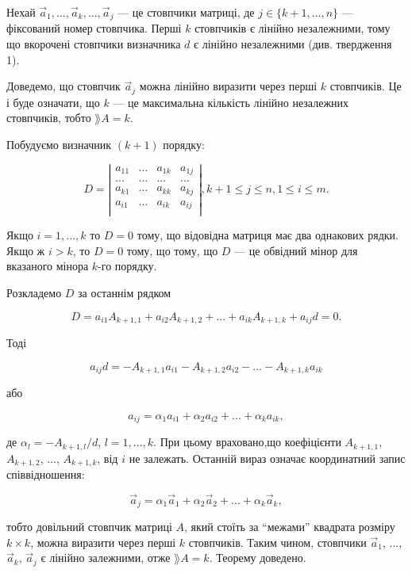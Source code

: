 Нехай $\overrightarrow{a}_1, ...,\overrightarrow{a}_k, ..., \overrightarrow{a}_j$ --- це
стовпчики матриці, де $j \in \{k+1, ..., n\}$ ---
фіксований номер стовпчика. Перші $k$ стовпчиків є лінійно незалежними, тому що
вкорочені стовпчики визначника $d$ є лінійно незалежними (див. твердження 1).

Доведемо, що стовпчик $\overrightarrow{a}_j$ можна лінійно виразити через перші $k$ стовпчиків.
Це і буде означати, що $k$ --- це максимальна кількість лінійно незалежних
стовпчиків, тобто $\rang A = k$.


Побудуємо визначник $(k + 1)$ порядку:

$$D = \left| \begin{matrix}
	a_{11} & ... & a_{1k} & a_{1j} \\
	...    & ... & ...    & ...    \\
	a_{k1} & ... & a_{kk} & a_{kj} \\
	a_{i1} & ... & a_{ik} & a_{ij} \\
\end{matrix} \right|, k+1 \leqslant j \leqslant n, 1 \leqslant i \leqslant m.$$


Якщо $i = 1, ..., k$ то $D = 0$ тому, що відовідна матриця має два однакових
рядки. Якщо ж $i > k$, то $D = 0$ тому, що тому, що $D$ --- це обвідний мінор для
вказаного мінора $k$-го порядку.

Розкладемо $D$ за останнім рядком

$$D = a_{i1} A_{k+1, 1} + a_{i2} A_{k+1, 2} + ... + a_{ik} A_{k+1, k} + a_{ij} d = 0.$$

Тоді

$$a_{ij} d = -A_{k+1,1} a_{i1} -A_{k+1,2} a_{i2} -... -A_{k+1,k} a_{ik}$$

або

$$a_{ij} = \alpha_1 a_{i1} + \alpha_2 a_{i2} + ... + \alpha_k a_{ik},$$

де $\alpha_l = -A_{k+1,l}/d$, $l = 1, ..., k$. При цьому враховано,що коефіцієнти $A_{k+1,1}$, $A_{k+1,2}$, ...,
$A_{k+1,k}$, від $i$ не залежать. Останній вираз означає координатний запис
співвідношення:

$$\overrightarrow{a}_{j} = \alpha_1 \overrightarrow{a}_1 + \alpha_2 \overrightarrow{a}_2 + ... + \alpha_k \overrightarrow{a}_k,$$


тобто довільний стовпчик матриці $A$, який стоїть за “межами” квадрата розміру
$k \times k$, можна виразити через перші $k$ стовпчиків. Таким чином, стовпчики $\overrightarrow{a}_1$, ...,
$\overrightarrow{a}_k$, $\overrightarrow{a}_j$ є лінійно залежними, отже $\rang A = k$. Теорему доведено.



